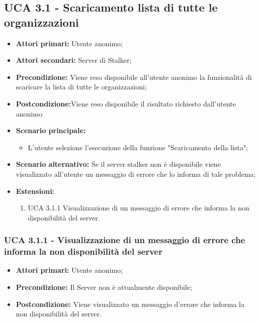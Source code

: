 \subsection{UCA 3.1 - Scaricamento lista di tutte le organizzazioni}%
\begin{itemize}
\item \textbf{Attori primari:} Utente anonimo;
\item \textbf{Attori secondari: } Server di Stalker;
\item \textbf{Precondizione:} Viene reso disponibile all’utente anonimo la funzionalità di scaricare la lista di tutte le organizzazioni;
\item \textbf{Postcondizione:}Viene reso disponibile il risultato richiesto dall’utente anonimo
\item \textbf{Scenario principale:} 
\begin{itemize}
	\item L'utente selezione l'esecuzione della funzione "Scaricamento della lista";
\end{itemize}
\item \textbf{Scenario alternativo:}  Se il server stalker non è disponibile viene visualizzato all’utente un messaggio di errore che lo informa di tale problema;
\item \textbf{Estensioni:}
	\begin{enumerate}
	\item UCA 3.1.1 Visualizzazione di un messaggio di errore che informa la non disponibilità del server.
\end{enumerate}
  
\end{itemize}

\subsubsection{UCA 3.1.1 - Visualizzazione di un messaggio di errore che informa la non disponibilità del server}%
\begin{itemize}
\item \textbf{Attori primari:} Utente anonimo;
\item \textbf{Precondizione:} Il Server non è attualmente disponibile;
\item \textbf{Postcondizione:} Viene visualizzato un messaggio d’errore che informa la non disponibilità del server.

\end{itemize}

